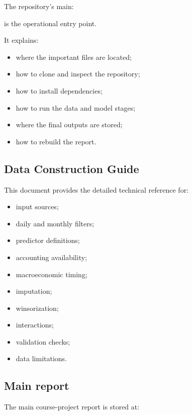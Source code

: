 \documentclass[11pt,a4paper]{article}
\begin{document}
The repository's main:

\begin{center}
\end{center}

is the operational entry point.

It explains:

\begin{itemize}
  \item where the important files are located;
  \item how to clone and inspect the repository;
  \item how to install dependencies;
  \item how to run the data and model stages;
  \item where the final outputs are stored;
  \item how to rebuild the report.
\end{itemize}

\subsection{Data Construction Guide}

This document provides the detailed technical reference for:

\begin{itemize}
  \item input sources;
  \item daily and monthly filters;
  \item predictor definitions;
  \item accounting availability;
  \item macroeconomic timing;
  \item imputation;
  \item winsorization;
  \item interactions;
  \item validation checks;
  \item data limitations.
\end{itemize}

\subsection{Main report}

The main course-project report is stored at:

\begin{center}
\end{center}
\end{document}
